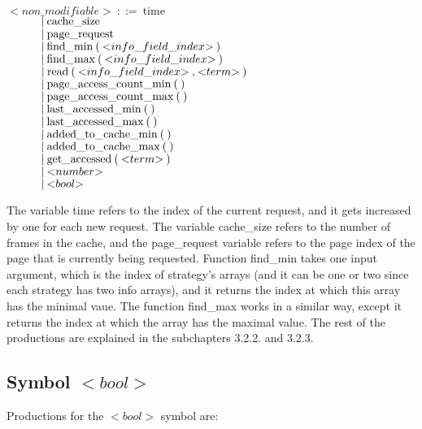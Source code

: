 \noindent
$ {<}non\_modifiable{>}\:::=\:\text{time} $\\
$ \indent\indent |\:\text{cache\_size} $\\
$ \indent\indent |\:\text{page\_request} $\\
$ \indent\indent |\:\text{find\_min}\:\text{(}\:{<}info\_field\_index{>}\:\text{)} $\\
$ \indent\indent |\:\text{find\_max}\:\text{(}\:{<}info\_field\_index{>}\:\text{)} $\\
$ \indent\indent |\:\text{read}\:\text{(}\:{<}info\_field\_index{>}\:\text{,}\:{<}term{>}\:\text{)} $\\
$ \indent\indent |\:\text{page\_access\_count\_min}\:\text{(}\:\text{)}$\\
$ \indent\indent |\:\text{page\_access\_count\_max}\:\text{(}\:\text{)}$\\
$ \indent\indent |\:\text{last\_accessed\_min}\:\text{(}\:\text{)}$\\
$ \indent\indent |\:\text{last\_accessed\_max}\:\text{(}\:\text{)}$\\
$ \indent\indent |\:\text{added\_to\_cache\_min}\:\text{(}\:\text{)}$\\
$ \indent\indent |\:\text{added\_to\_cache\_max}\:\text{(}\:\text{)}$\\
$ \indent\indent |\:\text{get\_accessed}\:\text{(}\:{<}term{>}\:\text{)}$\\
$ \indent\indent |\:{<}number{>} $\\
$ \indent\indent |\:{<}bool{>} $

The variable time refers to the index of the current request, and it gets increased by one for each new request. The variable cache\_size refers to the number of frames in the cache, and the page\_request variable refers to the page index of the page that is currently being requested. Function find\_min takes one input argument, which is the index of strategy's arrays (and it can be one or two since each strategy has two info arrays), and it returns the index at which this array has the minimal vaue. The function find\_max works in a similar way, except it returns the index at which the array has the maximal value. The rest of the productions are explained in the subchapters 3.2.2. and 3.2.3.

\subsection{Symbol ${<}bool{>}$}
Productions for the ${<}bool{>}$ symbol are:

